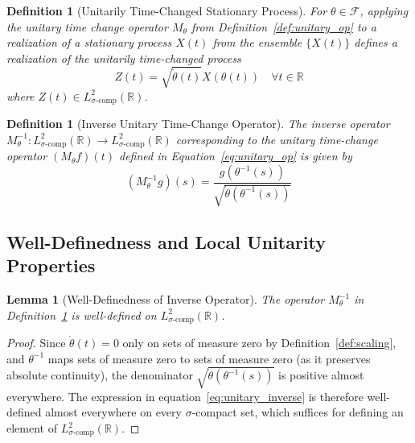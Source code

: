 \documentclass{article}
\newtheorem{lemma}[theorem]{Lemma}
\newtheorem{definition}[theorem]{Definition}
\begin{document}
\begin{definition}[Unitarily Time-Changed Stationary Process]\label{def:time_changed_proc}
For $\theta \in \mathcal{F}$, applying the unitary time change operator $M_{\theta}$ from Definition~\ref{def:unitary_op} to a realization of a stationary process $X(t)$ from the ensemble $\{X(t)\}$ defines a realization of the unitarily time-changed process
\begin{equation}
\label{eq:time_change}
Z(t) = \sqrt{\dot{\theta}(t)} X(\theta(t)) \quad \forall t \in \mathbb{R}
\end{equation}
where $Z(t) \in L^2_{\sigma\text{-comp}}(\mathbb{R})$.
\end{definition}

\begin{definition}[Inverse Unitary Time-Change Operator]\label{def:inverse_unitary_op}
The inverse operator $M_{\theta}^{-1} : L^2_{\sigma\text{-comp}}(\mathbb{R}) \to L^2_{\sigma\text{-comp}}(\mathbb{R})$ corresponding to the unitary time-change operator $(M_{\theta} f)(t)$ defined in Equation~\eqref{eq:unitary_op} is given by
\begin{equation}
\label{eq:unitary_inverse}
(M_{\theta}^{-1} g)(s) = \frac{g(\theta^{-1}(s))}{\sqrt{\dot{\theta}(\theta^{-1}(s))}}
\end{equation}
\end{definition}

\subsection{Well-Definedness and Local Unitarity Properties}

\begin{lemma}[Well-Definedness of Inverse Operator]\label{lem:inverse_well_defined}
The operator $M_{\theta}^{-1}$ in Definition~\ref{def:inverse_unitary_op} is well-defined on $L^2_{\sigma\text{-comp}}(\mathbb{R})$.
\end{lemma}
\begin{proof}
Since $\dot{\theta}(t) = 0$ only on sets of measure zero by Definition~\ref{def:scaling}, and $\theta^{-1}$ maps sets of measure zero to sets of measure zero (as it preserves absolute continuity), the denominator $\sqrt{\dot{\theta}(\theta^{-1}(s))}$ is positive almost everywhere. The expression in equation~\eqref{eq:unitary_inverse} is therefore well-defined almost everywhere on every $\sigma$-compact set, which suffices for defining an element of $L^2_{\sigma\text{-comp}}(\mathbb{R})$.
\end{proof}
\end{document}
